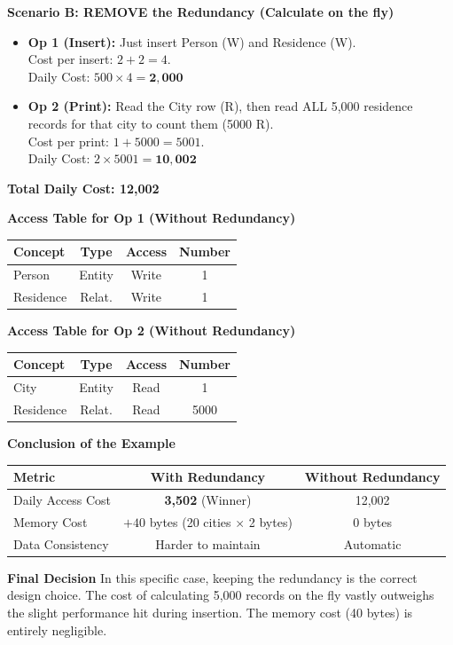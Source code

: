 \vspace{0.3cm}
\textbf{Scenario B: REMOVE the Redundancy (Calculate on the fly)}
\begin{itemize}
    \item \textbf{Op 1 (Insert):} Just insert Person (W) and Residence (W). \\
    Cost per insert: $2 + 2 = 4$. \\
    Daily Cost: $500 \times 4 = \mathbf{2,000}$
    

    \vs
    \item \textbf{Op 2 (Print):} Read the City row (R), then read ALL 5,000 residence records for that city to count them (5000 R). \\
    Cost per print: $1 + 5000 = 5001$. \\
    Daily Cost: $2 \times 5001 = \mathbf{10,002}$
\end{itemize}
\textbf{Total Daily Cost: 12,002}

\vspace{0.2cm}
\begin{center}
\textbf{Access Table for Op 1 (Without Redundancy)}

\begin{tabular}{|l|c|c|c|}
\hline
\textbf{Concept} & \textbf{Type} & \textbf{Access} & \textbf{Number} \\
\hline
Person & Entity & Write & 1 \\
Residence & Relat. & Write & 1 \\
\hline
\end{tabular}

\vspace{0.2cm}
\textbf{Access Table for Op 2 (Without Redundancy)}

\begin{tabular}{|l|c|c|c|}
\hline
\textbf{Concept} & \textbf{Type} & \textbf{Access} & \textbf{Number} \\
\hline
City & Entity & Read & 1 \\
Residence & Relat. & Read & 5000 \\
\hline
\end{tabular}
\end{center}

\vspace{0.3cm}
\textbf{Conclusion of the Example}


\begin{center}
\begin{tabular}{|l|c|c|}
\hline
\textbf{Metric} & \textbf{With Redundancy} & \textbf{Without Redundancy} \\
\hline
Daily Access Cost & \textbf{3,502} (Winner) & 12,002 \\
Memory Cost & $+40$ bytes (20 cities $\times$ 2 bytes) & 0 bytes \\
Data Consistency & Harder to maintain & Automatic \\
\hline
\end{tabular}
\end{center}

\vspace{0.25cm}
\textbf{Final Decision}
In this specific case, keeping the redundancy is the correct design choice. The cost of calculating 5,000 records on the fly vastly outweighs the slight performance hit during insertion. The memory cost (40 bytes) is entirely negligible.
